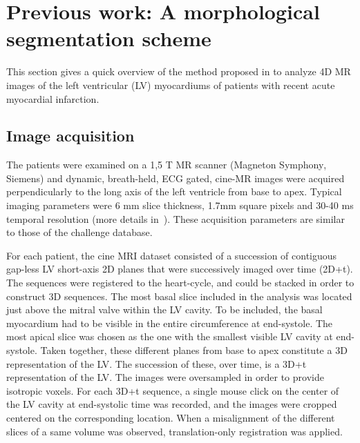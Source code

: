 \documentclass{llncs}
\begin{document}
\section{Previous work: A morphological segmentation scheme}
\label{sec:prevWork}
This section gives a quick overview of the method proposed in
\cite{CNC-et-al07} to analyze 4D MR images of the left
ventricular (LV) myocardiums of patients with recent acute myocardial
infarction.

\subsection{Image acquisition}
\label{sec:imAcquis}
The patients were examined on a 1,5 T MR scanner (Magneton
Symphony\textsuperscript{\textregistered}, Siemens) and dynamic, breath-held,
ECG gated, cine-MR images were acquired perpendicularly to the long axis of the
left ventricle from base to apex. Typical imaging parameters were 6 mm slice
thickness, 1.7mm square pixels and 30-40 ms temporal resolution (more details
in~\cite{NC-et-al-MICCAI2007}). These acquisition parameters are similar to
those of the challenge database.

For each patient, the cine MRI dataset consisted of a succession of contiguous
gap-less LV short-axis 2D planes that were successively imaged over time
(2D+t). The sequences were registered to the heart-cycle, and could be stacked
in order to construct 3D sequences. The most basal slice included in the
analysis was located just above the mitral valve within the LV cavity. To be
included, the basal myocardium had to be visible in the entire circumference at
end-systole. The most apical slice was chosen as the one with the smallest
visible LV cavity at end-systole. Taken together, these different planes from
base to apex constitute a 3D representation of the LV. The succession of these,
over time, is a 3D+t representation of the LV. The images were oversampled in order
to provide isotropic voxels. For each 3D+t sequence, a single mouse click on the
center of the LV cavity at end-systolic time was recorded, and the images were
cropped centered on the corresponding location. When a misalignment of the
different slices of a same volume was observed, translation-only registration
was applied.
%
\end{document}
